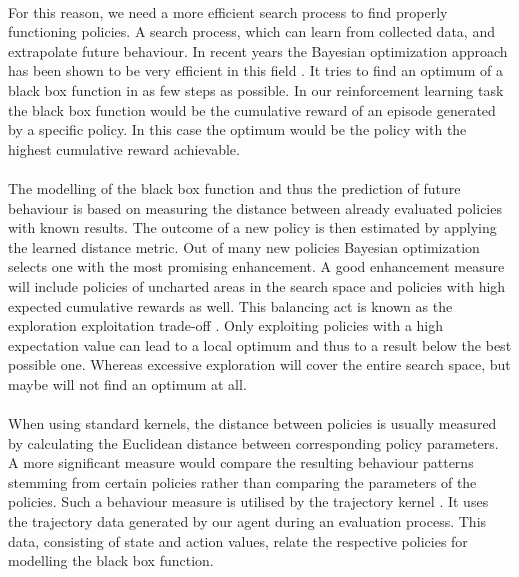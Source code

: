 \\
For this reason, we need a more efficient search process to find properly functioning policies. A search process, which can learn from collected data, and extrapolate future behaviour. In recent years the Bayesian optimization approach has been shown to be very efficient in this field \cite{brochu2010tutorial, shahriari2016taking, lizotte2008practical}. It tries to find an optimum of a black box function in as few steps as possible. In our reinforcement learning task the black box function would be the cumulative reward of an episode generated by a specific policy. In this case the optimum would be the policy with the highest cumulative reward achievable.\\
\\
The modelling of the black box function and thus the prediction of future behaviour is based on measuring the distance between already evaluated policies with known results. The outcome of a new policy is then estimated by applying the learned distance metric. Out of many new policies Bayesian optimization selects one with the most promising enhancement. A good enhancement measure will include policies of uncharted areas in the search space and policies with high expected cumulative rewards as well. This balancing act is known as the exploration exploitation trade-off \cite{brochu2010tutorial}. Only exploiting policies with a high expectation value can lead to a local optimum and thus to a result below the best possible one. Whereas excessive exploration will cover the entire search space, but maybe will not find an optimum at all.\\
\\
When using standard kernels, the distance between policies is usually measured by calculating the Euclidean distance \cite{rasmussen2006gaussian} between corresponding policy parameters. A more significant measure would compare the resulting behaviour patterns stemming from certain policies rather than comparing the parameters of the policies. Such a behaviour measure is utilised by the trajectory kernel \cite{wilson2014using}. It uses the trajectory data generated by our agent during an evaluation process. This data, consisting of state and action values, relate the respective policies for modelling the black box function.\\
\\

